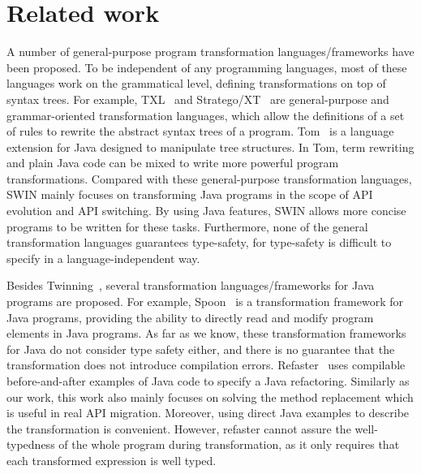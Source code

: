 \section{Related work}
\label{sec:related}

 A number of
general-purpose program transformation languages/frameworks have been proposed.
To be independent of any programming languages, most of these languages
work on the grammatical level, defining transformations on top of
syntax trees. For example, TXL~\cite{txl} and
Stratego/XT~\cite{stratego} are general-purpose and grammar-oriented
transformation languages, which allow the definitions of a set of
rules to rewrite the abstract syntax trees of a program. Tom~\cite{tom} is a language extension for Java designed
to manipulate tree structures. In Tom, term rewriting and plain Java
code can be mixed to write more powerful program transformations.%
Compared with
these general-purpose transformation languages, SWIN mainly focuses on
transforming Java programs in the scope of API evolution and API
switching. By using Java features, SWIN allows more concise programs
to be written for these tasks. Furthermore, none of the general
transformation languages guarantees type-safety, for type-safety is
difficult to specify in a language-independent way.

 Besides
Twinning~\cite{twinning}, 
several transformation languages/frameworks for Java
programs are proposed. For example, Spoon~\cite{fool06} 
is a transformation framework for Java programs, providing the ability
to directly read and modify program elements in Java
programs. As far as we know, these transformation frameworks for Java do
not consider type safety either, and there is no guarantee that the
transformation does not introduce compilation errors. Refaster~\cite{refaster}
uses compilable before-and-after examples of Java code to specify a Java
refactoring. Similarly as our work, this work also mainly focuses on solving the
method replacement which is useful in real API migration. Moreover, using 
direct Java examples to describe the transformation is convenient. However,
refaster cannot assure the well-typedness of the whole program during transformation, 
         as it only requires that each transformed expression is well typed.


